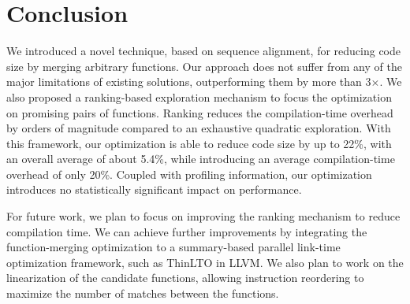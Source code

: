 \vspace{-2ex}
\section{Conclusion}

We introduced a novel technique, based on sequence alignment, for reducing
code size by merging arbitrary functions. Our approach does not suffer from
any of the major limitations of existing solutions, outperforming them by more
than 3$\times$. We also proposed a ranking-based
exploration mechanism to focus the optimization on promising pairs of
functions. Ranking reduces the compilation-time overhead by orders of magnitude
compared to an exhaustive quadratic exploration. With this framework, our
optimization is able to reduce code size by up to 22\%, with an overall average
of about 5.4\%, while introducing an average compilation-time overhead of only 20\%.
Coupled with profiling information, our optimization introduces no statistically
significant impact on performance.

For future work, we plan to focus on improving the ranking mechanism to reduce
compilation time.
We can achieve further improvements by integrating the
function-merging optimization to a summary-based parallel link-time optimization
framework, such as ThinLTO in LLVM.
We also plan to work on the linearization of the candidate functions, allowing
instruction reordering to maximize the number of matches between the functions.
